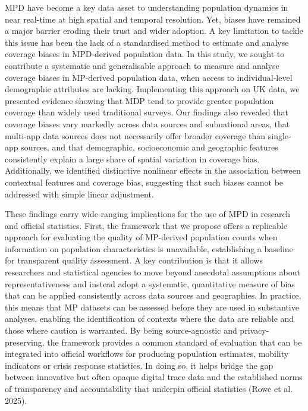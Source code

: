 \documentclass{article}
\begin{document}
MPD have become a key data asset to understanding population dynamics in
near real-time at high spatial and temporal resolution. Yet, biases have
remained a major barrier eroding their trust and wider adoption. A key
limitation to tackle this issue has been the lack of a standardised
method to estimate and analyse coverage biases in MPD-derived population
data. In this study, we sought to contribute a systematic and
generalisable approach to measure and analyse coverage biases in
MP-derived population data, when access to individual-level demographic
attributes are lacking. Implementing this approach on UK data, we
presented evidence showing that MDP tend to provide greater population
coverage than widely used traditional surveys. Our findings also
revealed that coverage biases vary markedly across data sources and
subnational areas, that multi-app data sources does not necessarily
offer broader coverage than single-app sources, and that demographic,
socioeconomic and geographic features consistently explain a large share
of spatial variation in coverage bias. Additionally, we identified
distinctive nonlinear effects in the association between contextual
features and coverage bias, suggesting that such biases cannot be
addressed with simple linear adjustment.

These findings carry wide-ranging implications for the use of MPD in
research and official statistics. First, the framework that we propose
offers a replicable approach for evaluating the quality of MP-derived
population counts when information on population characteristics is
unavailable, establishing a baseline for transparent quality assessment.
A key contribution is that it allows researchers and statistical
agencies to move beyond anecdotal assumptions about representativeness
and instead adopt a systematic, quantitative measure of bias that can be
applied consistently across data sources and geographies. In practice,
this means that MP datasets can be assessed before they are used in
substantive analyses, enabling the identification of contexts where the
data are reliable and those where caution is warranted. By being
source-agnostic and privacy-preserving, the framework provides a common
standard of evaluation that can be integrated into official workflows
for producing population estimates, mobility indicators or crisis
response statistics. In doing so, it helps bridge the gap between
innovative but often opaque digital trace data and the established norms
of transparency and accountability that underpin official statistics
(Rowe et al. 2025).
\end{document}
